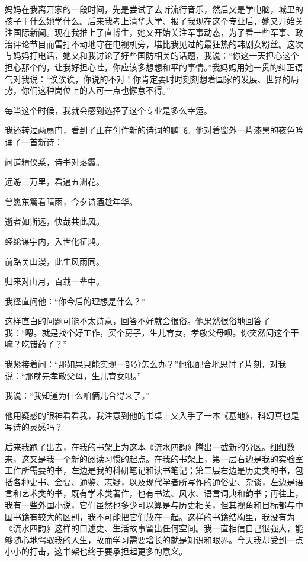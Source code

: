 \documentclass[openany,scheme = chinese, linespread = 1.5]{ctexbook}
\begin{document}
妈妈在我离开家的一段时间，先是尝试了去听流行音乐，然后又是学电脑，城里的孩子干什么她学什么。后来我考上清华大学、报了我现在这个专业后，她又开始关注国际新闻。现在我推上了直博生，她又开始关注军事动态，为了看一些军事、政治评论节目而雷打不动地守在电视机旁，堪比我见过的最狂热的韩剧女粉丝。这次与妈妈打电话，她又和我讨论了好些国防相关的话题，我说：“你这一天担心这个担心那个的，让我好担心哇，你应该多想想和平的事情。”我妈妈用她一贯的纠正语气对我说：“诶诶诶，你说的不对！你肯定要时时刻刻想着国家的发展、世界的局势，你们这种岗位上的人可一点也懈怠不得。”

每当这个时候，我就会感到选择了这个专业是多么幸运。

我还转过两扇门，看到了正在创作新的诗词的鹏飞。他对着窗外一片漆黑的夜色吟诵了一首新诗：
\begin{center}
问道精仪系，诗书对落霞。

远游三万里，看遍五洲花。

曾愿东篱看晴雨，今夕诗酒趁年华。

逝者如斯远，快哉共此风。

经纶谋宇内，入世化征鸿。

前路关山漫，此生风雨同。

归来对山月，百载一辈中。
\end{center}

我径直问他：“你今后的理想是什么？”

这样直白的问题可能不太诗意，回答不好就会很俗。他果然很俗地回答了我：“嗯。就是找个好工作，买个房子，生儿育女，孝敬父母呗。你突然问这个干嘛？吃错药了？”

我紧接着问：“那如果只能实现一部分怎么办？”他很配合地思忖了片刻，对我说：“那就先孝敬父母，生儿育女呗。”

我说：“我知道为什么咱俩儿合得来了。”

他用疑惑的眼神看看我，我注意到他的书桌上又入手了一本《基地》，科幻真也是写诗的灵感吗？

后来我跑了出去，在我的书架上为这本《流水四韵》腾出一截新的分区。细细数来，这又是我一个新的阅读习惯的起点。在我的书架上，第一层右边是我的实验室工作所需要的书，左边是我的科研笔记和读书笔记；第二层右边是历史类的书，包括各种史书、会要、通鉴、志疑，以及现代学者所写作的通俗史、杂谈，左边是语言和艺术类的书，既有学术类著作，也有书法、风水、语言词典和韵书；再往上，我有一些外国小说，它们虽然也多少可以算是与历史相关，但其视角和目标都与中国书籍有较大的区别，我不可能把它们放在一起。这样的书籍结构里，我没有为《流水四韵》这样的口述史、生活故事留出任何空间。我一直相信自己很强大，能够随心地驾驭我的人生，故而学习需要增长的就是知识和眼界。今天我却受到一点小小的打击，这书架也终于要承担起更多的意义。
\end{document}
